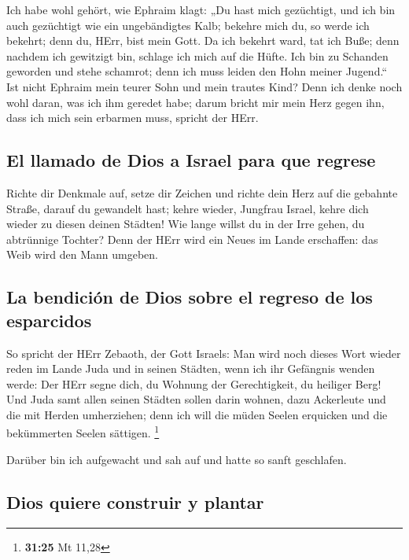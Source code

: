  Ich habe wohl gehört, wie Ephraim klagt: „Du hast mich
gezüchtigt, und ich bin auch gezüchtigt wie ein ungebändigtes Kalb;
bekehre mich du, so werde ich bekehrt; denn du, HErr, bist mein Gott.
 Da ich bekehrt ward, tat ich Buße; denn nachdem ich
gewitzigt bin, schlage ich mich auf die Hüfte. Ich bin zu Schanden
geworden und stehe schamrot; denn ich muss leiden den Hohn meiner
Jugend.``  Ist nicht Ephraim mein teurer Sohn und mein
trautes Kind? Denn ich denke noch wohl daran, was ich ihm geredet habe;
darum bricht mir mein Herz gegen ihn, dass ich mich sein erbarmen muss,
spricht der HErr.

\hypertarget{el-llamado-de-dios-a-israel-para-que-regrese}{%
\subsection{El llamado de Dios a Israel para que
regrese}\label{el-llamado-de-dios-a-israel-para-que-regrese}}

 Richte dir Denkmale auf, setze dir Zeichen und richte
dein Herz auf die gebahnte Straße, darauf du gewandelt hast; kehre
wieder, Jungfrau Israel, kehre dich wieder zu diesen deinen Städten!
 Wie lange willst du in der Irre gehen, du abtrünnige
Tochter? Denn der HErr wird ein Neues im Lande erschaffen: das Weib wird
den Mann umgeben.

\hypertarget{la-bendiciuxf3n-de-dios-sobre-el-regreso-de-los-esparcidos}{%
\subsection{La bendición de Dios sobre el regreso de los
esparcidos}\label{la-bendiciuxf3n-de-dios-sobre-el-regreso-de-los-esparcidos}}

 So spricht der HErr Zebaoth, der Gott Israels: Man wird
noch dieses Wort wieder reden im Lande Juda und in seinen Städten, wenn
ich ihr Gefängnis wenden werde: Der HErr segne dich, du Wohnung der
Gerechtigkeit, du heiliger Berg!  Und Juda samt allen
seinen Städten sollen darin wohnen, dazu Ackerleute und die mit Herden
umherziehen;  denn ich will die müden Seelen erquicken
und die bekümmerten Seelen sättigen. \footnote{\textbf{31:25} Mt 11,28}

 Darüber bin ich aufgewacht und sah auf und hatte so
sanft geschlafen.

\hypertarget{dios-quiere-construir-y-plantar}{%
\subsection{Dios quiere construir y
plantar}\label{dios-quiere-construir-y-plantar}}

